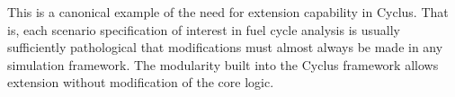 This is a canonical example of the need for extension
capability in Cyclus. That is, each scenario specification of interest in fuel
cycle analysis is usually sufficiently pathological that modifications must
almost always be made in any simulation framework. The modularity built into
the Cyclus framework allows extension without modification of the core logic.  


